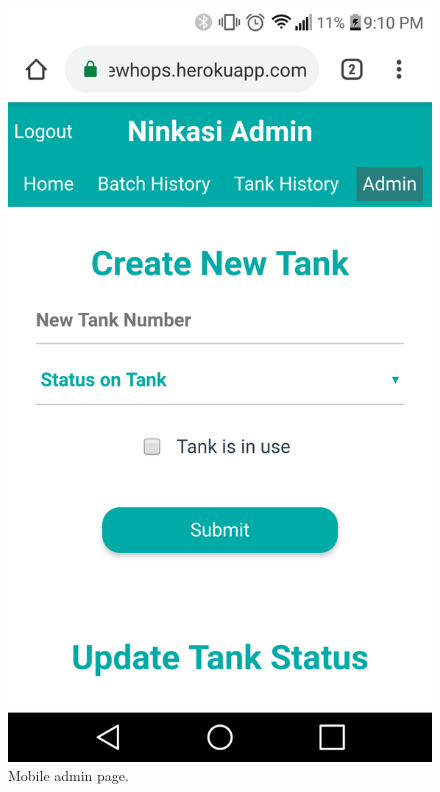 \documentclass[draftclsnofoot,onecolumn,journal,letterpaper,compsoc,10pt]{IEEEtran}
\begin{document}
\begin{figure}[H]
    \centering
    \includegraphics[height=0.4\textheight]{screenshots/progress_report_screencap-mobile_admin.png}
    \caption{Mobile admin page.}
\end{figure}


\end{document}
